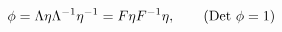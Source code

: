 \begin{equation}
\phi = \Lambda \eta \Lambda^{-1} \eta^{-1}=F \eta F^{-1} \eta,~~~~~~
({\rm Det}~\phi=1)
\end{equation}

